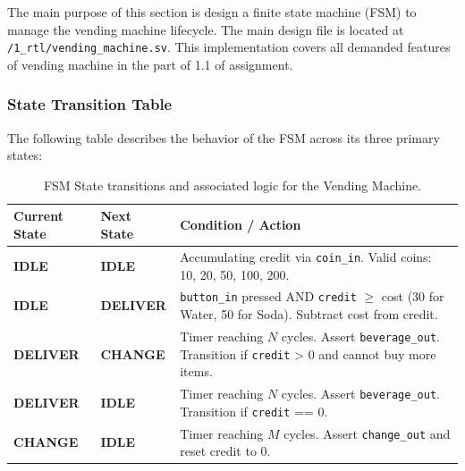 \documentclass[11pt]{article}
\begin{document}
The main purpose of this section is design a finite state machine (FSM) to manage the vending machine lifecycle. The main design file is located at \texttt{/1\_rtl/vending\_machine.sv}. This implementation covers all demanded features of vending machine in the part of 1.1 of assignment.

\subsubsection*{State Transition Table}
The following table describes the behavior of the FSM across its three primary states:

\begin{table}[h!]
\centering
\renewcommand{\arraystretch}{1.5}
\begin{tabular}{|l|l|p{6cm}|}
\hline
\textbf{Current State} & \textbf{Next State} & \textbf{Condition / Action} \\ \hline
\textbf{IDLE} & \textbf{IDLE} & Accumulating credit via \texttt{coin\_in}. Valid coins: 10, 20, 50, 100, 200. \\ \hline
\textbf{IDLE} & \textbf{DELIVER} & \texttt{button\_in} pressed AND \texttt{credit} $\ge$ cost (30 for Water, 50 for Soda). Subtract cost from credit. \\ \hline
\textbf{DELIVER} & \textbf{CHANGE} & Timer reaching $N$ cycles. Assert \texttt{beverage\_out}. Transition if \texttt{credit} > 0 and cannot buy more items. \\ \hline
\textbf{DELIVER} & \textbf{IDLE} & Timer reaching $N$ cycles. Assert \texttt{beverage\_out}. Transition if \texttt{credit} == 0. \\ \hline
\textbf{CHANGE} & \textbf{IDLE} & Timer reaching $M$ cycles. Assert \texttt{change\_out} and reset credit to 0. \\ \hline
\end{tabular}
\caption{FSM State transitions and associated logic for the Vending Machine.}
\end{table}
\end{document}
